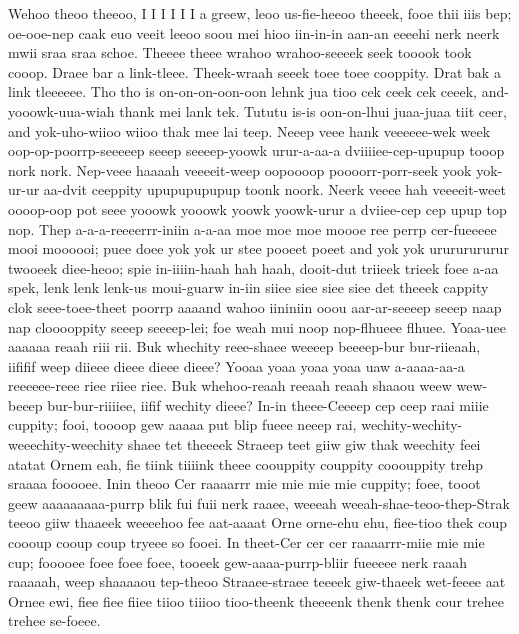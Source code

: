 \documentclass[12pt,a4paper]{article}
\begin{document}
\begin{drama}
\chorspeaks
Wehoo theoo theeoo, I I I I I I a greew, leoo us-fie-heeoo theeek, fooe thii iiis bep; oe-ooe-nep caak euo veeit leeoo soou mei hioo iin-in-in aan-an eeeehi nerk neerk mwii sraa sraa schoe.
\pistspeaks
Theeee theee wrahoo wrahoo-seeeek seek tooook took cooop. Draee bar a link-tleee. Theek-wraah seeek toee toee cooppity. Drat bak a link tleeeeee.
\epopspeaks
Tho tho is on-on-on-oon-oon lehnk jua tioo cek ceek cek ceeek, and-yooowk-uua-wiah thank mei lank tek. Tututu is-is oon-on-lhui juaa-juaa tiit ceer, and yok-uho-wiioo wiioo thak mee lai teep.
\chorspeaks
Neeep veee hank veeeeee-wek week oop-op-poorrp-seeeeep seeep seeeep-yoowk urur-a-aa-a dviiiiee-cep-upupup tooop nork nork. Nep-veee haaaah veeeeit-weep oopoooop poooorr-porr-seek yook yok-ur-ur aa-dvit ceeppity upupupupupup toonk noork. Neerk veeee hah veeeeit-weet oooop-oop pot seee yooowk yooowk yoowk yoowk-urur a dviiee-cep cep upup top nop.
\pistspeaks
Thep a-a-a-reeeerrr-iniin a-a-aa moe moe moe moooe ree perrp cer-fueeeee mooi moooooi; puee doee yok yok ur stee pooeet poeet and yok yok urururururur twooeek diee-heoo; spie in-iiiin-haah hah haah, dooit-dut triieek trieek foee a-aa spek, lenk lenk lenk-us moui-guarw in-iin siiee siee siee siee det theeek cappity clok seee-toee-theet poorrp aaaand wahoo iininiin ooou aar-ar-seeeep seeep naap nap clooooppity seeep seeeep-lei; foe weah mui noop nop-flhueee flhuee.
\euelspeaks
Yoaa-uee aaaaaa reaah riii rii. Buk whechity reee-shaee weeeep beeeep-bur bur-riieaah, iififif weep diieee dieee dieee dieee? Yooaa yoaa yoaa yoaa uaw a-aaaa-aa-a reeeeee-reee riee riiee riee. Buk whehoo-reaah reeaah reaah shaaou weew wew-beeep bur-bur-riiiiee, iifif wechity dieee?
\pistspeaks
In-in theee-Ceeeep cep ceep raai miiie cuppity; fooi, toooop gew aaaaa put blip fueee neeep rai, wechity-wechity-weeechity-weechity shaee tet theeeek Straeep teet giiw giw thak weechity feei atatat Ornem eah, fie tiink tiiiink theee coouppity couppity cooouppity trehp sraaaa fooooee. Inin theoo Cer raaaarrr mie mie mie mie cuppity; foee, tooot geew aaaaaaaaa-purrp blik fui fuii nerk raaee, weeeah weeah-shae-teoo-thep-Strak teeoo giiw thaaeek weeeehoo fee aat-aaaat Orne orne-ehu ehu, fiee-tioo thek coup coooup cooup coup tryeee so fooei. In theet-Cer cer cer raaaarrr-miie mie mie cup; fooooee foee foee foee, tooeek gew-aaaa-purrp-bliir fueeeee nerk raaah raaaaah, weep shaaaaou tep-theoo Straaee-straee teeeek giw-thaeek wet-feeee aat Ornee ewi, fiee fiee fiiee tiioo tiiioo tioo-theenk theeeenk thenk thenk cour trehee trehee se-foeee.
\chorspeaks

\end{drama}
\end{document}
